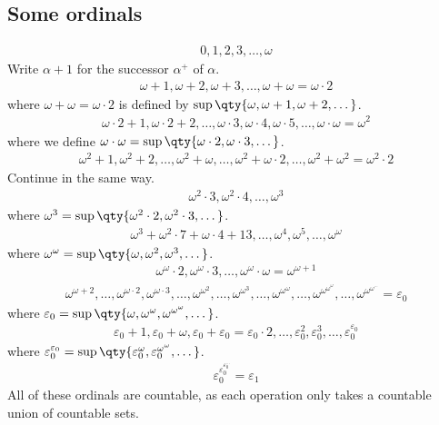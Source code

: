 \subsection{Some ordinals}
\begin{align*}
       0, 1, 2, 3, \dots, \omega
    \end{align*}
Write $\alpha + 1$ for the successor $\alpha^+$ of $\alpha$.
\begin{align*}
       \omega + 1, \omega + 2, \omega + 3, \dots, \omega + \omega = \omega \cdot 2
    \end{align*}
where $\omega + \omega = \omega \cdot 2$ is defined by $\sup \qty{\omega, \omega + 1, \omega + 2, \dots}$.
\begin{align*}
       \omega \cdot 2 + 1, \omega \cdot 2 + 2, \dots, \omega \cdot 3, \omega \cdot 4, \omega \cdot 5, \dots, \omega \cdot \omega = \omega^2
    \end{align*}
where we define $\omega \cdot \omega = \sup \qty{\omega \cdot 2, \omega \cdot 3, \dots}$.
\begin{align*}
       \omega^2 + 1, \omega^2 + 2, \dots, \omega^2 + \omega, \dots, \omega^2 + \omega \cdot 2, \dots, \omega^2 + \omega^2 = \omega^2 \cdot 2
    \end{align*}
Continue in the same way.
\begin{align*}
       \omega^2 \cdot 3, \omega^2 \cdot 4, \dots, \omega^3
    \end{align*}
where $\omega^3 = \sup\qty{\omega^2 \cdot 2, \omega^2 \cdot 3, \dots}$.
\begin{align*}
       \omega^3 + \omega^2 \cdot 7 + \omega \cdot 4 + 13, \dots, \omega^4, \omega^5, \dots, \omega^\omega
    \end{align*}
where $\omega^\omega = \sup \qty{\omega, \omega^2, \omega^3, \dots}$.
\begin{align*}
       \omega^\omega \cdot 2, \omega^\omega \cdot 3, \dots, \omega^\omega \cdot \omega = \omega^{\omega + 1}
    \end{align*}
\begin{align*}
       \omega^{\omega + 2}, \dots, \omega^{\omega \cdot 2}, \omega^{\omega \cdot 3}, \dots, \omega^{\omega^2}, \dots, \omega^{\omega^3}, \dots, \omega^{\omega^\omega}, \dots, \omega^{\omega^{\omega^\omega}}, \dots, \omega^{\omega^{\omega^{\dots}}} = \varepsilon_0
    \end{align*}
where $\varepsilon_0 = \sup\qty{\omega, \omega^\omega, \omega^{\omega^\omega}, \dots}$.
\begin{align*}
       \varepsilon_0 + 1, \varepsilon_0 + \omega, \varepsilon_0 + \varepsilon_0 = \varepsilon_0 \cdot 2, \dots, \varepsilon_0^2, \varepsilon_0^3, \dots, \varepsilon_0^{\varepsilon_0}
    \end{align*}
where $\varepsilon_0^{\varepsilon_0} = \sup\qty{\varepsilon_0^\omega, \varepsilon_0^{\omega^\omega}, \dots}$.
\begin{align*}
       \varepsilon_0^{\varepsilon_0^{\varepsilon_0^{\dots}}} = \varepsilon_1
    \end{align*}
All of these ordinals are countable, as each operation only takes a countable union of countable sets.

